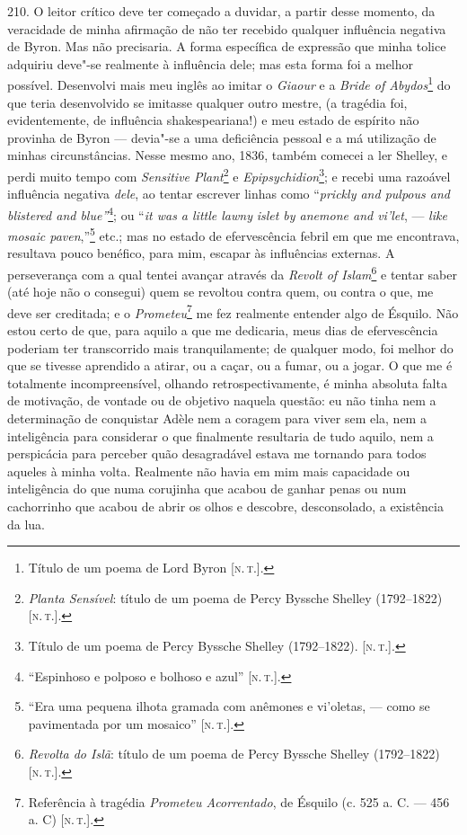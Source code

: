 210. O leitor crítico deve ter começado a duvidar, a partir desse
momento, da veracidade de minha afirmação de não ter recebido qualquer
influência negativa de Byron. Mas não precisaria. A forma específica de
expressão que minha tolice adquiriu deve"-se realmente à influência dele;
mas esta forma foi a melhor possível. Desenvolvi mais meu inglês ao
imitar o \emph{Giaour} e a \emph{Bride of Abydos}\footnote{Título de um
  poema de Lord Byron {[}\textsc{n.\,t.}{]}.} do que teria desenvolvido se
imitasse qualquer outro mestre, (a tragédia foi, evidentemente, de
influência shakespeariana!) e meu estado de espírito não provinha de
Byron --- devia"-se a uma deficiência pessoal e a má utilização de minhas
circunstâncias. Nesse mesmo ano, 1836, também comecei a ler Shelley, e
perdi muito tempo com \emph{Sensitive Plant}\footnote{\emph{Planta
  Sensível}: título de um poema de Percy Byssche Shelley (1792--1822)
  {[}\textsc{n.\,t.}{]}.} e \emph{Epipsychidion}\footnote{Título de um poema de
  Percy Byssche Shelley (1792--1822). {[}\textsc{n.\,t.}{]}.}; e recebi uma
razoável influência negativa \emph{dele}, ao tentar escrever linhas como
``\emph{prickly and pulpous and blistered and blue''}\footnote{``Espinhoso
  e polposo e bolhoso e azul'' {[}\textsc{n.\,t.}{]}.}; ou ``\emph{it was a
little lawny} \emph{islet by anemone and vi'let}, --- \emph{like mosaic
paven},''\footnote{``Era uma pequena ilhota gramada com anêmones e
  vi'oletas, --- como se pavimentada por um mosaico'' {[}\textsc{n.\,t.}{]}.}
etc.; mas no estado de efervescência febril em que me encontrava,
resultava pouco benéfico, para mim, escapar às influências externas. A
perseverança com a qual tentei avançar através da \emph{Revolt of
Islam}\footnote{\emph{Revolta do Islã}: título de um poema de Percy
  Byssche Shelley (1792--1822) {[}\textsc{n.\,t.}{]}.} e tentar saber (até hoje
não o consegui) quem se revoltou contra quem, ou contra o que, me deve
ser creditada; e o \emph{Prometeu}\footnote{Referência à tragédia
  \emph{Prometeu Acorrentado}, de Ésquilo (c. 525 a. C. --- 456 a. C)
  {[}\textsc{n.\,t.}{]}.} me fez realmente entender algo de Ésquilo. Não estou
certo de que, para aquilo a que me dedicaria, meus dias de efervescência
poderiam ter transcorrido mais tranquilamente; de qualquer modo, foi
melhor do que se tivesse aprendido a atirar, ou a caçar, ou a fumar, ou
a jogar. O que me é totalmente incompreensível, olhando
retrospectivamente, é minha absoluta falta de motivação, de vontade ou
de objetivo naquela questão: eu não tinha nem a determinação de
conquistar Adèle nem a coragem para viver sem ela, nem a inteligência
para considerar o que finalmente resultaria de tudo aquilo, nem a
perspicácia para perceber quão desagradável estava me tornando para
todos aqueles à minha volta. Realmente não havia em mim mais capacidade
ou inteligência do que numa corujinha que acabou de ganhar penas ou num
cachorrinho que acabou de abrir os olhos e descobre, desconsolado, a
existência da lua.


